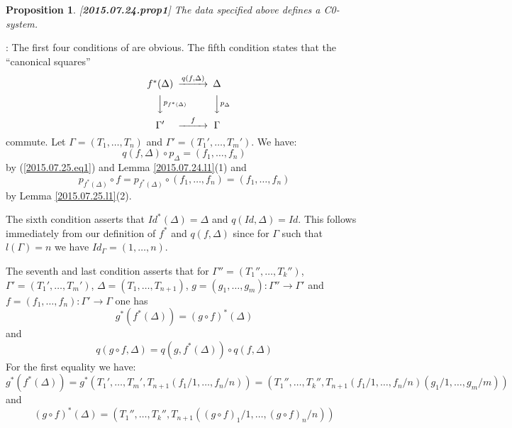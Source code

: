 \documentclass[11pt]{article}
\newenvironment{proof}{{\bf Proof}:}{\vskip 5mm }
\newtheorem{proposition}{Proposition}[subsection]
\newcommand{\llabel}[1]{\label{#1}[{\bf #1}]}
\newcommand{\sr}{\rightarrow}
\begin{document}
%
\begin{proposition}
\llabel{2015.07.24.prop1}
The data specified above defines a C0-system.
\end{proposition}
%
\begin{proof}
The first four conditions of \cite[Definition 2.1]{Csubsystems} are obvious. The fifth condition states that the ``canonical squares''
%
$$
\begin{CD}
f^*(\Delta) @>q(f,\Delta)>> \Delta\\
@VVp_{f^*(\Delta)}V @VVp_{\Delta}V\\
\Gamma' @>f>> \Gamma
\end{CD}
$$
%
commute. Let $\Gamma=(T_1,\dots,T_n)$ and $\Gamma'=(T_1',\dots,T_m')$. We have:
%
$$q(f,\Delta)\circ p_{\Delta}=(f_1,\dots,f_n)$$
%
by (\ref{2015.07.25.eq1}) and Lemma \ref{2015.07.24.l1}(1) and
%
$$p_{f^*(\Delta)}\circ f=p_{f^*(\Delta)}\circ (f_1,\dots,f_n)=(f_1,\dots,f_n)$$
%
by Lemma \ref{2015.07.25.l1}(2).

The sixth condition asserts that $Id^*(\Delta)=\Delta$ and $q(Id,\Delta)=Id$. This follows immediately from our definition of $f^*$ and $q(f,\Delta)$ since for $\Gamma$ such that $l(\Gamma)=n$ we have $Id_{\Gamma}=(1,\dots,n)$.

The seventh and last condition asserts that for $\Gamma''=(T_1'',\dots,T_{k}'')$, $\Gamma'=(T_1',\dots,T_m')$, $\Delta=(T_1,\dots,T_{n+1})$, $g=(g_1,\dots, g_m):\Gamma''\sr \Gamma'$ and $f=(f_1,\dots,f_n):\Gamma'\sr \Gamma$ one has
%
$$g^*(f^*(\Delta))=(g\circ f)^*(\Delta)$$
%
and
%
$$q(g\circ f, \Delta)=q(g, f^*(\Delta))\circ q(f,\Delta)$$
%
%
For the first equality we have:
%
$$g^*(f^*(\Delta))=g^*(T_1',\dots,T_m',T_{n+1}(f_1/1,\dots,f_n/n))=(T_1'',\dots,T_{k}'',T_{n+1}(f_1/1,\dots,f_n/n)(g_1/1,\dots,g_m/m))$$
%
and
%
$$(g\circ f)^*(\Delta)=(T_1'',\dots,T_{k}'',T_{n+1}((g\circ f)_1/1,\dots,(g\circ f)_n/n))$$
%


\end{proof}
\end{document}
